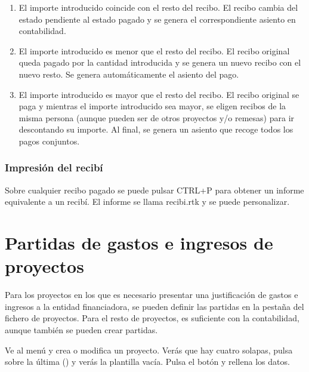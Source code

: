 \liststyleLx
\begin{enumerate}
\item El importe introducido coincide con el resto del recibo. El recibo
cambia del estado pendiente al estado pagado y se genera el
correspondiente asiento en contabilidad.
\item El importe introducido es menor que el resto del recibo. El recibo
original queda pagado por la cantidad introducida y se genera un nuevo
recibo con el nuevo resto. Se genera automáticamente el asiento del
pago.
\item El importe introducido es mayor que el resto del recibo. El recibo
original se paga y mientras el importe introducido sea mayor, se eligen
recibos de la misma persona (aunque pueden ser de otros proyectos y/o
remesas) para ir descontando su importe. Al final, se genera un asiento
que recoge todos los pagos conjuntos.
\end{enumerate}

\bigskip

\subsubsection{Impresión del recibí}
Sobre cualquier recibo pagado se puede pulsar CTRL+P para obtener un
informe equivalente a un recibí. El informe se llama recibi.rtk y se
puede personalizar.


\bigskip


\bigskip


\bigskip


\bigskip


\bigskip

\clearpage
\bigskip

\section{Partidas de gastos e ingresos de proyectos}
\label{ref:Partidasproyectos}\label{ref:Partidasproyetos}Para los
proyectos en los que es necesario presentar una justificación de
gastos e ingresos a la entidad financiadora, se pueden definir las
partidas en la pestaña
 del fichero de
proyectos. Para el resto de proyectos, es suficiente con la
contabilidad, aunque también se pueden crear partidas.

Ve al menú \textstyleGUIELEMENT{$\rightarrow $} y crea o modifica un proyecto. Verás que hay cuatro solapas,
pulsa sobre la última
() y verás la
plantilla vacía. Pulsa el botón  y rellena los datos.

